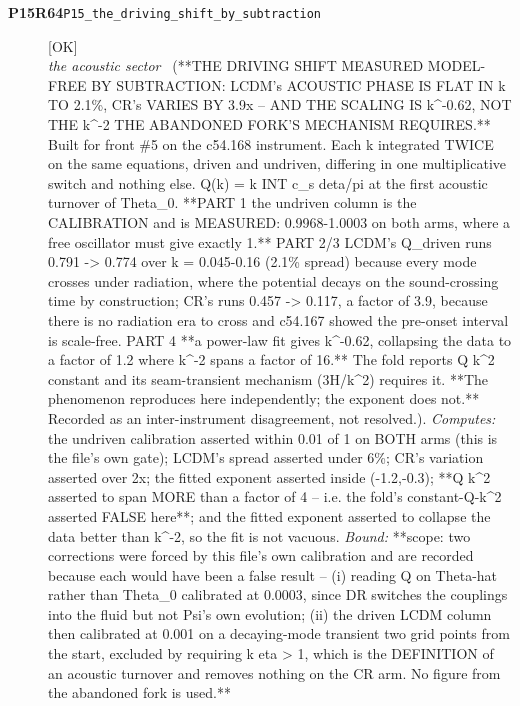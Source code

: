 \begin{description}
\item[\textbf{P15R64}\quad\texttt{P15\_the\_driving\_shift\_by\_subtraction}]\hfill\textsf{[OK]}\\
\textit{the acoustic sector} \ (**THE DRIVING SHIFT MEASURED MODEL-FREE BY SUBTRACTION: LCDM's ACOUSTIC PHASE IS FLAT IN k TO 2.1\%, CR's VARIES BY 3.9x -- AND THE SCALING IS k\textasciicircum{}-0.62, NOT THE k\textasciicircum{}-2 THE ABANDONED FORK'S MECHANISM REQUIRES.** Built for front \#5 on the c54.168 instrument. Each k integrated TWICE on the same equations, driven and undriven, differing in one multiplicative switch and nothing else. Q(k) = k INT c\_s deta/pi at the first acoustic turnover of Theta\_0. **PART 1 the undriven column is the CALIBRATION and is MEASURED: 0.9968-1.0003 on both arms, where a free oscillator must give exactly 1.** PART 2/3 LCDM's Q\_driven runs 0.791 -> 0.774 over k = 0.045-0.16 (2.1\% spread) because every mode crosses under radiation, where the potential decays on the sound-crossing time by construction; CR's runs 0.457 -> 0.117, a factor of 3.9, because there is no radiation era to cross and c54.167 showed the pre-onset interval is scale-free. PART 4 **a power-law fit gives k\textasciicircum{}-0.62, collapsing the data to a factor of 1.2 where k\textasciicircum{}-2 spans a factor of 16.** The fold reports Q k\textasciicircum{}2 constant and its seam-transient mechanism (3H/k\textasciicircum{}2) requires it. **The phenomenon reproduces here independently; the exponent does not.** Recorded as an inter-instrument disagreement, not resolved.). 
\emph{Computes:} the undriven calibration asserted within 0.01 of 1 on BOTH arms (this is the file's own gate); LCDM's spread asserted under 6\%; CR's variation asserted over 2x; the fitted exponent asserted inside (-1.2,-0.3); **Q k\textasciicircum{}2 asserted to span MORE than a factor of 4 -- i.e. the fold's constant-Q-k\textasciicircum{}2 asserted FALSE here**; and the fitted exponent asserted to collapse the data better than k\textasciicircum{}-2, so the fit is not vacuous.
 \emph{Bound:} **scope: two corrections were forced by this file's own calibration and are recorded because each would have been a false result -- (i) reading Q on Theta-hat rather than Theta\_0 calibrated at 0.0003, since DR switches the couplings into the fluid but not Psi's own evolution; (ii) the driven LCDM column then calibrated at 0.001 on a decaying-mode transient two grid points from the start, excluded by requiring k eta > 1, which is the DEFINITION of an acoustic turnover and removes nothing on the CR arm. No figure from the abandoned fork is used.**

\end{description}
